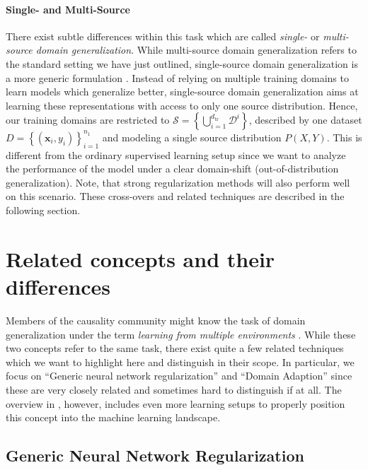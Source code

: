 \paragraph{Single- and Multi-Source}
There exist subtle differences within this task which are called \emph{single-} or \emph{multi-source domain generalization}. While multi-source domain generalization refers to the standard setting we have just outlined, single-source domain generalization is a more generic formulation \citep{zunino2020explainable}. Instead of relying on multiple training domains to learn models which generalize better, single-source domain generalization aims at learning these representations with access to only one source distribution. Hence, our training domains are restricted to $\mathcal{S} = \left\{\bigcup_{i=1}^{d_\mathrm{tr}}\mathcal{D}^{i}\right\}$, described by one dataset $D=\left\{\left(\mathbf{x}_{i}, y_{i}\right)\right\}_{i=1}^{n_{1}}$ and modeling a single source distribution $P\left(X, Y\right)$. This is different from the ordinary supervised learning setup since we want to analyze the performance of the model under a clear domain-shift (\ie out-of-distribution generalization). Note, that strong regularization methods will also perform well on this scenario. These cross-overs and related techniques are described in the following section.

\section{Related concepts and their differences}

Members of the causality community might know the task of domain generalization under the term \emph{learning from multiple environments} \citep{arjovsky2019invariant, gulrajani2020search, PetBuhMei15}. While these two concepts refer to the same task, there exist quite a few related techniques which we want to highlight here and distinguish in their scope. In particular, we focus on ``Generic neural network regularization'' and ``Domain Adaption'' since these are very closely related and sometimes hard to distinguish if at all. The overview in , however, includes even more learning setups to properly position this concept into the machine learning landscape.

\subsection{Generic Neural Network Regularization}


